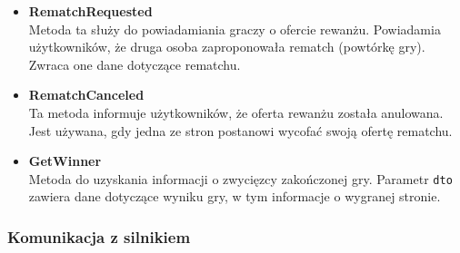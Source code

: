 \documentclass[12pt,a4paper]{article}
\begin{document}
\begin{itemize}
    \item \textbf{RematchRequested} \\
    Metoda ta służy do powiadamiania graczy o ofercie rewanżu. Powiadamia użytkowników, że druga osoba zaproponowała rematch (powtórkę gry). Zwraca one dane dotyczące rematchu.

    \item \textbf{RematchCanceled} \\
    Ta metoda informuje użytkowników, że oferta rewanżu została anulowana. Jest używana, gdy jedna ze stron postanowi wycofać swoją ofertę rematchu.

    \item \textbf{GetWinner} \\
    Metoda do uzyskania informacji o zwycięzcy zakończonej gry. Parametr \texttt{dto} zawiera dane dotyczące wyniku gry, w tym informacje o wygranej stronie.

\end{itemize}

\newpage

\subsubsection{Komunikacja z silnikiem}
\end{document}
